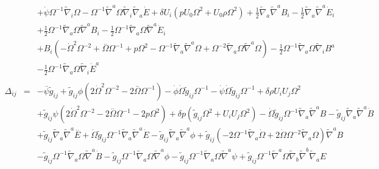 \documentclass[10pt,letterpaper]{article}
\numberwithin{equation}{section}
\begin{document}
\begin{eqnarray}
&& + \dot{\psi} \Omega^{-1} \tilde{\nabla}_{i}\Omega -  \Omega^{-1} \tilde{\nabla}^{a}\Omega \tilde{\nabla}_{i}\tilde{\nabla}_{a}\dot{E}+\delta U_{i} (p U_{0}{} \Omega^2 + U_{0}{} \rho \Omega^2) + \tfrac{1}{2} \tilde{\nabla}_{a}\tilde{\nabla}^{a}B_{i} -  \tfrac{1}{2} \tilde{\nabla}_{a}\tilde{\nabla}^{a}\dot{E}_{i} \nonumber \\ 
&& + \tfrac{1}{2} \Omega^{-1} \tilde{\nabla}_{a}\Omega \tilde{\nabla}^{a}B_{i} -  \tfrac{1}{2} \Omega^{-1} \tilde{\nabla}_{a}\Omega \tilde{\nabla}^{a}\dot{E}_{i} \nonumber \\ 
&& + B_{i} (- \dot{\Omega}^2 \Omega^{-2} + \overset{..}{\Omega} \Omega^{-1} + p \Omega^2 -  \Omega^{-1} \tilde{\nabla}_{a}\tilde{\nabla}^{a}\Omega + \Omega^{-2} \tilde{\nabla}_{a}\Omega \tilde{\nabla}^{a}\Omega) -  \tfrac{1}{2} \Omega^{-1} \tilde{\nabla}_{a}\Omega \tilde{\nabla}_{i}B^{a} \nonumber \\ 
&& -  \tfrac{1}{2} \Omega^{-1} \tilde{\nabla}_{a}\Omega \tilde{\nabla}_{i}\dot{E}^{a}
\\  \nonumber\\ 
\Delta_{ij}&=& - \overset{..}{\psi} \tilde{g}_{ij} + \tilde{g}_{ij} \phi (2 \dot{\Omega}^2 \Omega^{-2} - 2 \overset{..}{\Omega} \Omega^{-1}) -  \dot{\phi} \dot{\Omega} \tilde{g}_{ij} \Omega^{-1} -  \dot{\psi} \dot{\Omega} \tilde{g}_{ij} \Omega^{-1} + \delta \rho U_{i} U_{j} \Omega^2 \nonumber \\ 
&& + \tilde{g}_{ij} \psi (2 \dot{\Omega}^2 \Omega^{-2} - 2 \overset{..}{\Omega} \Omega^{-1} - 2 p \Omega^2) + \delta p (\tilde{g}_{ij} \Omega^2 + U_{i} U_{j} \Omega^2) -  \dot{\Omega} \tilde{g}_{ij} \Omega^{-1} \tilde{\nabla}_{a}\tilde{\nabla}^{a}B -  \tilde{g}_{ij} \tilde{\nabla}_{a}\tilde{\nabla}^{a}\dot{B} \nonumber \\ 
&& + \tilde{g}_{ij} \tilde{\nabla}_{a}\tilde{\nabla}^{a}\overset{..}{E} + \dot{\Omega} \tilde{g}_{ij} \Omega^{-1} \tilde{\nabla}_{a}\tilde{\nabla}^{a}\dot{E} -  \tilde{g}_{ij} \tilde{\nabla}_{a}\tilde{\nabla}^{a}\phi + \tilde{g}_{ij} (-2 \Omega^{-1} \tilde{\nabla}_{a}\dot{\Omega} + 2 \dot{\Omega} \Omega^{-2} \tilde{\nabla}_{a}\Omega) \tilde{\nabla}^{a}B \nonumber \\ 
&& -  \tilde{g}_{ij} \Omega^{-1} \tilde{\nabla}_{a}\Omega \tilde{\nabla}^{a}\dot{B} -  \tilde{g}_{ij} \Omega^{-1} \tilde{\nabla}_{a}\Omega \tilde{\nabla}^{a}\phi -  \tilde{g}_{ij} \Omega^{-1} \tilde{\nabla}_{a}\Omega \tilde{\nabla}^{a}\psi + \tilde{g}_{ij} \Omega^{-1} \tilde{\nabla}^{a}\Omega \tilde{\nabla}_{b}\tilde{\nabla}^{b}\tilde{\nabla}_{a}E \nonumber \\ 

\end{eqnarray}
\end{document}
